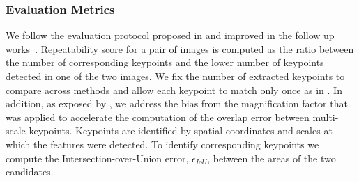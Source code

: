 


\subsubsection{Evaluation Metrics}
\label{subsec:Evaluation}
We follow the evaluation protocol proposed in \cite{mikolajczykpami2005} and improved in the follow up works~\cite{LIFT,Karel_Vedaldi_ECCV_16,Zhang_Felix_CVPR_17,Karel_Vedaldi_BMVC_18}. %
 Repeatability score for a pair of images is computed as the ratio between the number of corresponding keypoints and the lower number of keypoints detected in one of the two images. We fix the number of extracted keypoints to compare across methods and allow each keypoint to match only once as in \cite{FASTER, TILDE}. In addition, as exposed by \cite{Karel_Vedaldi_BMVC_18}, we address the bias from the magnification factor that was applied to accelerate the computation of the overlap error between multi-scale keypoints.
Keypoints are identified by spatial coordinates and scales at which the features were detected.  To identify corresponding keypoints we compute the Intersection-over-Union error, $\epsilon_{IoU}$, between the areas of the two candidates.
